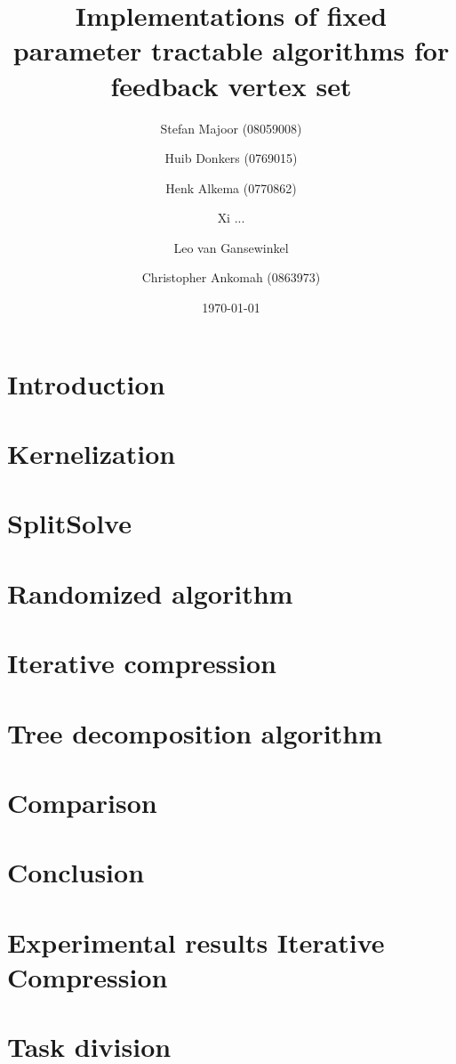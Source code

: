 \documentclass[a4paper,10pt]{article}
\title{Implementations of fixed parameter tractable algorithms for feedback vertex set}
\author{
	Stefan Majoor (08059008)
	\and
	Huib Donkers (0769015)
	\and
	Henk Alkema (0770862)
	\and
	Xi ...
	\and
	Leo van Gansewinkel
	\and
	Christopher Ankomah (0863973)
}
\date{\today}
\begin{document}
\maketitle
\setcounter{tocdepth}{2}
\tableofcontents
\clearpage

\begin{abstract}

\end{abstract}

\section{Introduction} \label{sec:intro}


\section{Kernelization} \label{sec:kern}


\section{SplitSolve} \label{sec:splitsolve}


\section{Randomized algorithm} \label{sec:rand}


\section{Iterative compression} \label{sec:itcomp}


\section{Tree decomposition algorithm} \label{sec:treewidth}


\section{Comparison} \label{sec:comparison}


\section{Conclusion} \label{sec:conclusion}

\clearpage
\appendix
\section{Experimental results Iterative Compression} \label{app:itcomp}


\section{Task division}

\end{document}
